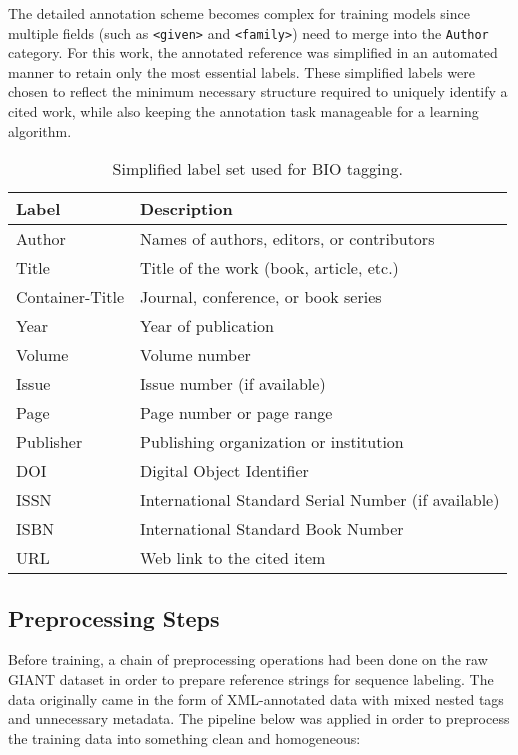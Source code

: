 The detailed annotation scheme becomes complex for training models since multiple fields (such as \texttt{<given>} and \texttt{<family>}) need to merge into the \texttt{Author} category.
For this work, the annotated reference was simplified in an automated manner to retain only the most essential labels. These simplified labels were chosen to reflect the minimum necessary structure required to uniquely identify a cited work, while also keeping the annotation task manageable for a learning algorithm.
\begin{table}[h]
\centering
\begin{tabular}{ll}
\textbf{Label} & \textbf{Description} \\
\hline
Author & Names of authors, editors, or contributors \\
Title & Title of the work (book, article, etc.) \\
Container-Title & Journal, conference, or book series \\
Year & Year of publication \\
Volume & Volume number \\
Issue & Issue number (if available) \\
Page & Page number or page range \\
Publisher & Publishing organization or institution \\
DOI & Digital Object Identifier \\
ISSN & International Standard Serial Number (if available) \\
ISBN & International Standard Book Number \\
URL & Web link to the cited item \\
\end{tabular}
\caption[Simplified Label Set for BIO Tagging]{Simplified label set used for BIO tagging.}
\label{tab:labels}
\end{table}

\subsection{Preprocessing Steps}
Before training, a chain of preprocessing operations had been done on the raw GIANT dataset in order to prepare reference strings for sequence labeling. The data originally came in the form of XML-annotated data with mixed nested tags and unnecessary metadata. The pipeline below was applied in order to preprocess the training data into something clean and homogeneous:
